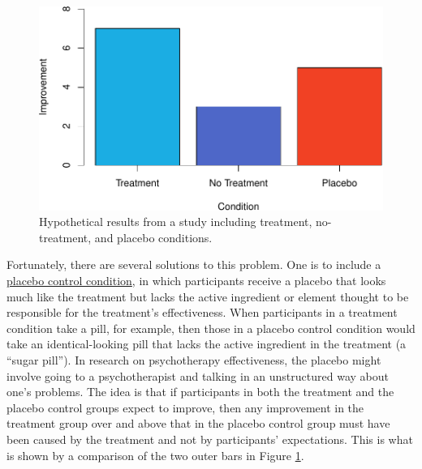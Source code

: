 \documentclass[
]{krantz}
\begin{document}
\begin{figure}

{\centering \includegraphics[width=0.8\linewidth]{05-experiments_files/figure-latex/placebo-1} 

}

\caption{Hypothetical results from a study including treatment, no-treatment, and placebo conditions.}\label{fig:placebo}
\end{figure}

Fortunately, there are several solutions to this problem. One is to include a \protect\hyperlink{placebo-control-condition}{placebo control condition}, in which participants receive a placebo that looks much like the treatment but lacks the active ingredient or element thought to be responsible for the treatment's effectiveness. When participants in a treatment condition take a pill, for example, then those in a placebo control condition would take an identical-looking pill that lacks the active ingredient in the treatment (a ``sugar pill''). In research on psychotherapy effectiveness, the placebo might involve going to a psychotherapist and talking in an unstructured way about one's problems. The idea is that if participants in both the treatment and the placebo control groups expect to improve, then any improvement in the treatment group over and above that in the placebo control group must have been caused by the treatment and not by participants' expectations. This is what is shown by a comparison of the two outer bars in Figure \ref{fig:placebo}.
\end{document}
